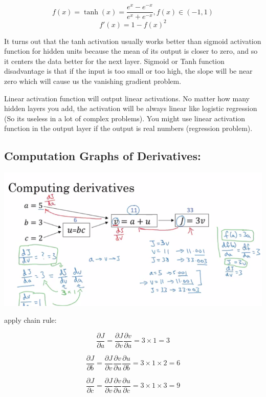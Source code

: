 \documentclass{article}
\begin{document}
\[f(x) = \tanh(x) = \frac {e^{x}-e^{-x}}{e^{x}+e^{-x}}, f(x) \in (-1, 1)\]
\[f'(x) = 1-f(x)^{2}\]

\noindent It turns out that the tanh activation usually works better than sigmoid activation function for hidden units because the mean of its output is closer to zero, and so it centers the data better for the next layer. Sigmoid or Tanh function disadvantage is that if the input is too small or too high, the slope will be near zero which will cause us the vanishing gradient problem.

\bigskip

\noindent Linear activation function will output linear activations. No matter how many hidden layers you add, the activation will be always linear like logistic regression (So its useless in a lot of complex problems). You might use linear activation function in the output layer if the output is real numbers (regression problem).

\subsection{Computation Graphs of Derivatives:}

\begin{center}
\includegraphics[scale=0.6]{./images/computation_graph.png}
\end{center}

\noindent apply chain rule:

\[\frac{\partial J}{\partial a} = \frac{\partial J}{\partial v} \frac{\partial v}{\partial a} = 3 \times 1 = 3\]

\[\frac{\partial J}{\partial b} = \frac{\partial J}{\partial v} \frac{\partial v}{\partial u} \frac{\partial u}{\partial b} = 3 \times 1 \times 2 = 6\]

\[\frac{\partial J}{\partial c} = \frac{\partial J}{\partial v} \frac{\partial v}{\partial u} \frac{\partial u}{\partial c} = 3 \times 1 \times 3 = 9\]
\end{document}
